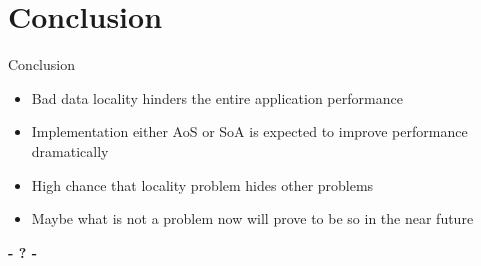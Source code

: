 \documentclass{beamer}
\begin{document}
\section{Conclusion}

\begin{frame}[fragile]
	
	\begin{block}{Conclusion}
		\begin{itemize}
			\item Bad data locality hinders the entire application performance
			\item Implementation either AoS or SoA is expected to improve performance dramatically 
			\item High chance that locality problem hides other problems
			\item Maybe what is not a problem now will prove to be so in the near future
		\end{itemize}
	\end{block}

\end{frame}

\begin{frame}
\titlepage
	\begin{center}
		\Huge\bfseries
		- ? -
	\end{center}
\end{frame}
\end{document}
